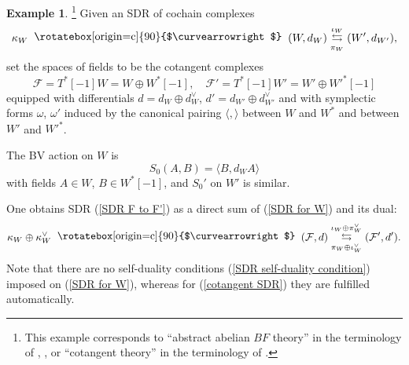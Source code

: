 \documentclass{amsart}
\theoremstyle{plain} %
\theoremstyle{definition}
\newtheorem{expl}[thm]{Example}
\theoremstyle{remark}
\newcommand{\F}{\mathcal{F}}
\newcommand{\SDR}[5]{#5\;\;\raisebox{1.3pt}{\rotatebox[origin=c]{90}{$\curvearrowright$}}\;\; #1 \underset{#4}{\stackrel{#3}{\leftrightarrows}} #2}  %
\begin{document}
\begin{expl}\!\!\!\footnote{This example corresponds to ``abstract abelian $BF$ theory'' in the terminology of \cite{simpBF}, \cite{discrBF}, or ``cotangent theory'' in the terminology of \cite{CG}.}
    Given an SDR of cochain complexes
    \begin{equation}\label{SDR for W}
        \SDR{(W,d_W)}{(W',d_{W'})}{\iota_W}{\pi_W}{\kappa_W},
    \end{equation}
    set the spaces of fields to be the cotangent complexes
    \begin{equation}
    \F=T^*[-1]W=W\oplus W^*[-1],\quad \F'=T^*[-1]W'=W'\oplus W'^*[-1]
    \end{equation} 
    equipped
    with differentials $d=d_W\oplus d_W^\vee$, $d'=d_{W'}\oplus d^\vee_{W'}$ and with symplectic forms $\omega$, $\omega'$ induced by the canonical pairing $\langle,\rangle$ between $W$ and $W^*$ and between $W'$ and $W'^*$. 

    The BV action on $W$ is 
    \begin{equation}
    S_0(A,B)=\langle B,d_W A \rangle
    \end{equation} 
    with fields $A\in W$, $B\in W^*[-1]$, and $S_0'$ on $W'$ is similar.
    
    One obtains SDR (\ref{SDR F to F'}) as a direct sum of (\ref{SDR for W}) and its dual:
    \begin{equation}\label{cotangent SDR}
        \SDR{(\F,d) %
        }{(\F',d') %
        }{\iota_W\oplus \pi_W^\vee}{\pi_W\oplus \iota_W^\vee}{\kappa_W\oplus \kappa_W^\vee}.
    \end{equation}
    Note that there are no self-duality conditions (\ref{SDR self-duality condition}) imposed on (\ref{SDR for W}), whereas for (\ref{cotangent SDR}) they are fulfilled automatically.
\end{expl}
\end{document}
